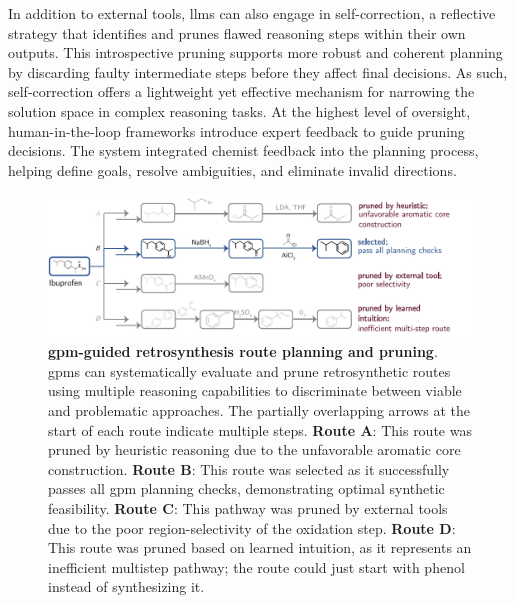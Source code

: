 In addition to external tools, \glspl{llm} can also engage in self-correction, a reflective strategy that identifies and prunes flawed reasoning steps within their own outputs. 
This introspective pruning supports more robust and coherent planning by discarding faulty intermediate steps before they affect final decisions. 
As such, self-correction offers a lightweight yet effective mechanism for narrowing the solution space in complex reasoning tasks. 
At the highest level of oversight, human-in-the-loop frameworks introduce expert feedback to guide pruning decisions. 
The  system\autocite{darvish2025organa} integrated chemist feedback into the planning process, helping define goals, resolve ambiguities, and eliminate invalid directions.
\begin{figure}[!htbp]
    \centering
        \includegraphics[width=1\textwidth]{figures/rescaled_figures/chemrev_figure14.pdf}
    \caption{\textbf{\gls{gpm}-guided retrosynthesis route planning and pruning}. \glspl{gpm} can systematically evaluate and prune retrosynthetic routes using multiple reasoning capabilities to discriminate between viable and problematic approaches. The partially overlapping arrows at the start of each route indicate multiple steps. \textbf{Route A}: This route was pruned by heuristic reasoning due to the unfavorable aromatic core construction.
    \textbf{Route B}: This route was selected as it successfully passes all \gls{gpm} planning checks, demonstrating optimal synthetic feasibility.
    \textbf{Route C}: This pathway was pruned by external tools due to the poor region-selectivity of the oxidation step.
    \textbf{Route D}: This route was pruned based on learned intuition, as it represents an inefficient multistep pathway; the route could just start with phenol instead of synthesizing it.
}
    \label{fig:planning}
\end{figure}

